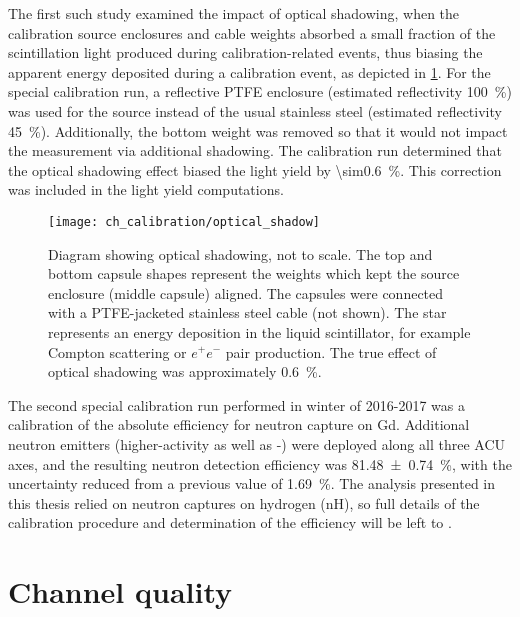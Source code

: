 The first such study examined the impact of optical shadowing,
when the calibration source enclosures and cable weights
absorbed a small fraction of the scintillation light
produced during calibration-related events,
thus biasing the apparent energy deposited during a calibration event,
as depicted in \cref{fig:optical_shadowing}.
For the special calibration run,
a reflective PTFE enclosure (estimated reflectivity \SI{100}{\percent})
was used for the  source
instead of the usual stainless steel (estimated reflectivity \SI{45}{\percent}).
Additionally, the bottom weight was removed
so that it would not impact the measurement via additional shadowing.
The calibration run determined that
the optical shadowing effect biased the light yield by \SI{\sim0.6}{\percent}.
This correction was included in the light yield computations.

\begin{figure}
    \centering
    \texttt{[image: ch\_calibration/optical\_shadow]}
    \caption{
        Diagram showing optical shadowing, not to scale.
        The top and bottom capsule shapes represent the weights
        which kept the source enclosure (middle capsule) aligned.
        The capsules were connected with a PTFE-jacketed stainless steel cable (not shown).
        The star represents an energy deposition in the liquid scintillator,
        for example Compton scattering or $e^+e^-$ pair production.
        The true effect of optical shadowing was approximately \SI{0.6}{\percent}.
    }
    \label{fig:optical_shadowing}
\end{figure}

The second special calibration run performed in winter of 2016-2017
was a calibration of the absolute efficiency for neutron capture on Gd.
Additional neutron emitters
(higher-activity \amc{} as well as -)
were deployed along all three ACU axes,
and the resulting neutron detection efficiency
was \SI{81.48\pm0.74}{\percent},
with the uncertainty reduced from a previous value of \SI{1.69}{\percent}.
The analysis presented in this thesis
relied on neutron captures on hydrogen (nH),
so full details of the calibration procedure and determination of the efficiency
will be left to \cite{reactor_flux2019}.

\section{Channel quality}
\label{sec:channel_quality}


